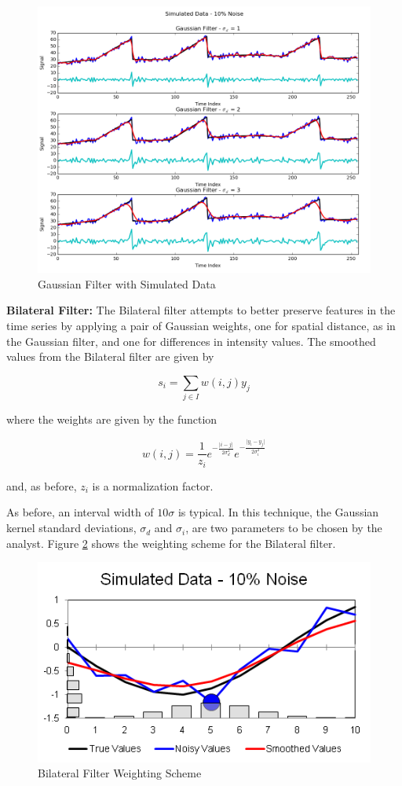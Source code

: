 \documentclass[11pt]{article}
\newcommand{\vs}{\vspace{0.1in}}
\theoremstyle{definition}
\begin{document}
\begin{figure}
\centering
\includegraphics[width = 0.65 \textwidth]{GaussianCompare.png}
\caption{Gaussian Filter with Simulated Data}
\label{gaussiancompare}
\end{figure}

\vs
\noindent
\textbf{Bilateral Filter:} The Bilateral filter attempts to better preserve features in the time series by applying a pair of Gaussian weights, one for spatial distance, as in the Gaussian filter, and one for differences in intensity values. The smoothed values from the Bilateral filter are given by

\begin{displaymath}
s_i = \sum _{j \in I} w \left(i, j \right) y_j
\end{displaymath}

\noindent
where the weights are given by the function

\begin{displaymath}
w\left(i, j\right) = \frac{1}{z_i} e^{-\frac{\lvert i - j \rvert}{2 \sigma_d^2}}e^{-\frac{\lvert y_i - y_j \rvert}{2 \sigma_i^2}}
\end{displaymath}

\noindent
and, as before, $z_i$ is a normalization factor.

As before, an interval width of $10 \sigma$ is typical. In this technique, the Gaussian kernel standard deviations, $\sigma_d$ and $\sigma_i$, are two parameters to be chosen by the analyst. Figure \ref{bilateraldemo} shows the weighting scheme for the Bilateral filter.

\begin{figure}
\centering
\includegraphics[width = 0.65 \textwidth]{BilateralDemo.png}
\caption{Bilateral Filter Weighting Scheme}
\label{bilateraldemo}
\end{figure}
\end{document}
